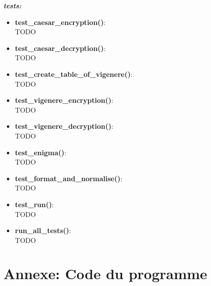 \documentclass[a4paper,12pt,abstracton,titlepage]{scrartcl}
\begin{document}
{%
\textit{\textbf{tests:}}\vspace{0.2cm}
\begin{itemize}
\item \textbf{test\_caesar\_encryption()}:\\
TODO\\
\item \textbf{test\_caesar\_decryption()}:\\
TODO\\
\item \textbf{test\_create\_table\_of\_vigenere()}:\\
TODO\\
\item \textbf{test\_vigenere\_encryption()}:\\
TODO\\
\item \textbf{test\_vigenere\_decryption()}:\\
TODO\\
\item \textbf{test\_enigma()}:\\
TODO\\
\item \textbf{test\_format\_and\_normalise()}:\\
TODO\\
\item \textbf{test\_run()}:\\
TODO\\
\item \textbf{run\_all\_tests()}:\\
TODO\\
\end{itemize}





\section{Annexe: Code du programme}









}
\end{document}
